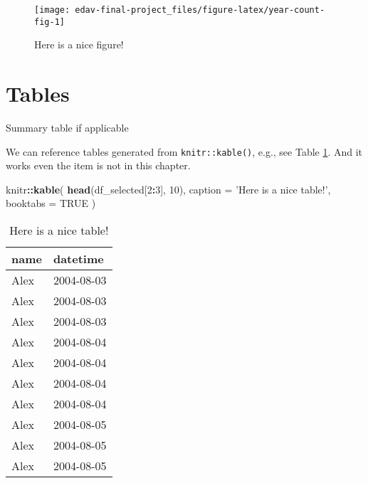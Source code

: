 \documentclass[]{book}
\newenvironment{Shaded}{\begin{snugshade}}{\end{snugshade}}
\newcommand{\DataTypeTok}[1]{\textcolor[rgb]{0.13,0.29,0.53}{#1}}
\newcommand{\DecValTok}[1]{\textcolor[rgb]{0.00,0.00,0.81}{#1}}
\newcommand{\KeywordTok}[1]{\textcolor[rgb]{0.13,0.29,0.53}{\textbf{#1}}}
\newcommand{\NormalTok}[1]{#1}
\newcommand{\OperatorTok}[1]{\textcolor[rgb]{0.81,0.36,0.00}{\textbf{#1}}}
\newcommand{\OtherTok}[1]{\textcolor[rgb]{0.56,0.35,0.01}{#1}}
\newcommand{\StringTok}[1]{\textcolor[rgb]{0.31,0.60,0.02}{#1}}
\begin{document}
\begin{figure}

{\centering \texttt{[image: edav-final-project\_files/figure-latex/year-count-fig-1]} 

}

\caption{Here is a nice figure!}\label{fig:year-count-fig}
\end{figure}

\hypertarget{tables}{%
\section{Tables}\label{tables}}

Summary table if applicable

We can reference tables generated from \texttt{knitr::kable()}, e.g., see Table \ref{tab:nice-tab}.
And it works even the item is not in this chapter.

\begin{Shaded}
\begin{Highlighting}[]
\NormalTok{knitr}\OperatorTok{::}\KeywordTok{kable}\NormalTok{(}
  \KeywordTok{head}\NormalTok{(df_selected[}\DecValTok{2}\OperatorTok{:}\DecValTok{3}\NormalTok{], }\DecValTok{10}\NormalTok{), }\DataTypeTok{caption =} \StringTok{'Here is a nice table!'}\NormalTok{,}
  \DataTypeTok{booktabs =} \OtherTok{TRUE}
\NormalTok{)}
\end{Highlighting}
\end{Shaded}

\begin{table}

\caption{\label{tab:nice-tab}Here is a nice table!}
\centering
\begin{tabular}[t]{ll}
\toprule
name & datetime\\
\midrule
Alex & 2004-08-03\\
Alex & 2004-08-03\\
Alex & 2004-08-03\\
Alex & 2004-08-04\\
Alex & 2004-08-04\\
\addlinespace
Alex & 2004-08-04\\
Alex & 2004-08-04\\
Alex & 2004-08-05\\
Alex & 2004-08-05\\
Alex & 2004-08-05\\
\bottomrule
\end{tabular}
\end{table}
\end{document}
